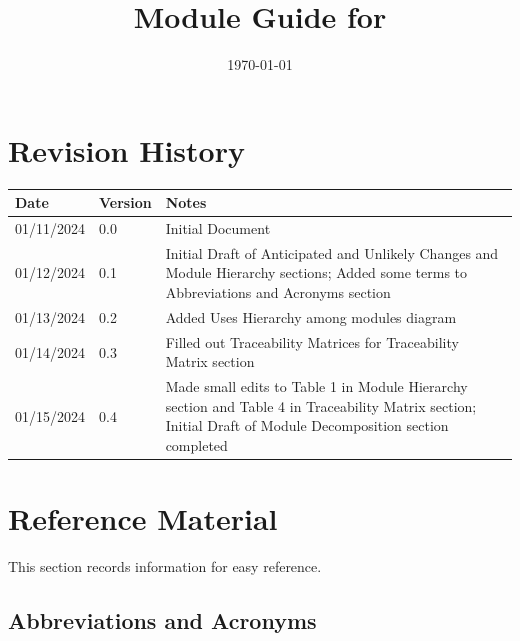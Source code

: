 \documentclass[12pt, titlepage]{article}
\begin{document}
\title{Module Guide for \progname{}} 
\author{\authname}
\date{\today}

\maketitle


\section{Revision History}

\begin{tabularx}{\textwidth}{p{3cm}p{2cm}X}
\toprule {\bf Date} & {\bf Version} & {\bf Notes}\\
\midrule
01/11/2024 & 0.0 & Initial Document \\
01/12/2024 & 0.1 & Initial Draft of Anticipated and Unlikely Changes and
  Module Hierarchy sections; Added some terms to Abbreviations and Acronyms
  section \\
01/13/2024 & 0.2 & Added Uses Hierarchy among modules diagram \\
01/14/2024 & 0.3 & Filled out Traceability Matrices for Traceability Matrix
  section \\
01/15/2024 & 0.4 & Made small edits to Table 1 in Module Hierarchy section and
  Table 4 in Traceability Matrix section; Initial Draft of Module
  Decomposition section completed \\
\bottomrule
\end{tabularx}

\newpage

\section{Reference Material}

This section records information for easy reference.

\subsection{Abbreviations and Acronyms}
\end{document}
